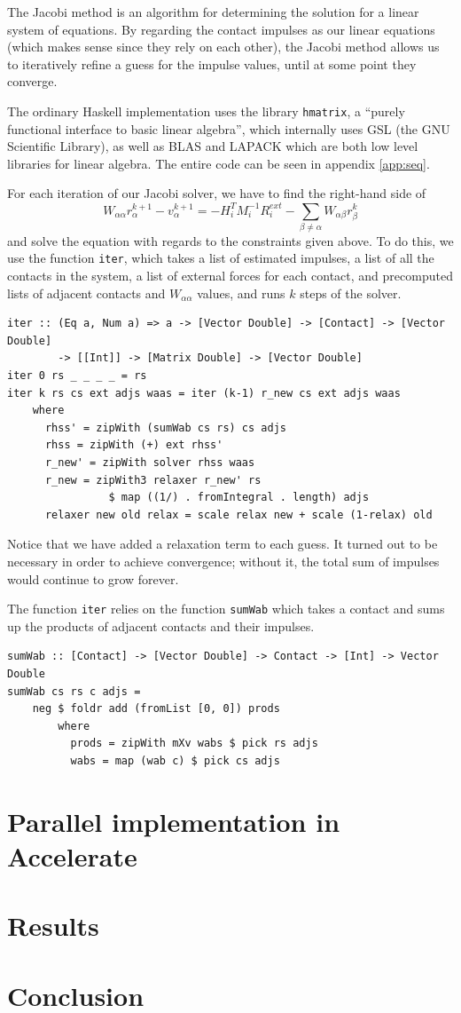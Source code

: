 \documentclass[runningheads,a4paper]{llncs}
\begin{document}
The Jacobi method is an algorithm for determining the solution for a linear
system of equations. By regarding the contact impulses as our linear equations
(which makes sense since they rely on each other), the Jacobi method allows us
to iteratively refine a guess for the impulse values, until at some point they
converge.

The ordinary Haskell implementation uses the library \verb+hmatrix+, a ``purely
functional interface to basic linear algebra'', which internally uses GSL (the
GNU Scientific Library), as well as BLAS and LAPACK which are both low level
libraries for linear algebra. The entire code can be seen in appendix
\ref{app:seq}.

For each iteration of our Jacobi solver, we have to find the right-hand side of
\begin{equation}
  W_{\alpha\alpha} r_\alpha^{k+1} - v_\alpha^{k+1}= - H_i^T M_i^{-1} R_i^{ext}
  - \displaystyle\sum\limits_{\beta \neq \alpha} W_{\alpha\beta} r_\beta^k
\end{equation}
and solve the equation with regards to the constraints given above. To do this,
we use the function \verb+iter+, which takes a list of estimated impulses, a
list of all the contacts in the system, a list of external forces for each
contact, and precomputed lists of adjacent contacts and $W_{\alpha\alpha}$
values, and runs $k$ steps of the solver.

\begin{verbatim}
iter :: (Eq a, Num a) => a -> [Vector Double] -> [Contact] -> [Vector Double]
        -> [[Int]] -> [Matrix Double] -> [Vector Double]
iter 0 rs _ _ _ _ = rs
iter k rs cs ext adjs waas = iter (k-1) r_new cs ext adjs waas
    where
      rhss' = zipWith (sumWab cs rs) cs adjs
      rhss = zipWith (+) ext rhss'
      r_new' = zipWith solver rhss waas
      r_new = zipWith3 relaxer r_new' rs
                $ map ((1/) . fromIntegral . length) adjs
      relaxer new old relax = scale relax new + scale (1-relax) old
\end{verbatim}
Notice that we have added a relaxation term to each guess. It turned out to be
necessary in order to achieve convergence; without it, the total sum of
impulses would continue to grow forever.

The function \verb+iter+ relies on the function \verb+sumWab+ which takes a
contact and sums up the products of adjacent contacts and their impulses.
\begin{verbatim}
sumWab :: [Contact] -> [Vector Double] -> Contact -> [Int] -> Vector Double
sumWab cs rs c adjs =
    neg $ foldr add (fromList [0, 0]) prods
        where
          prods = zipWith mXv wabs $ pick rs adjs
          wabs = map (wab c) $ pick cs adjs
\end{verbatim}

\section{Parallel implementation in Accelerate}

\section{Results}

\section{Conclusion}
\end{document}
